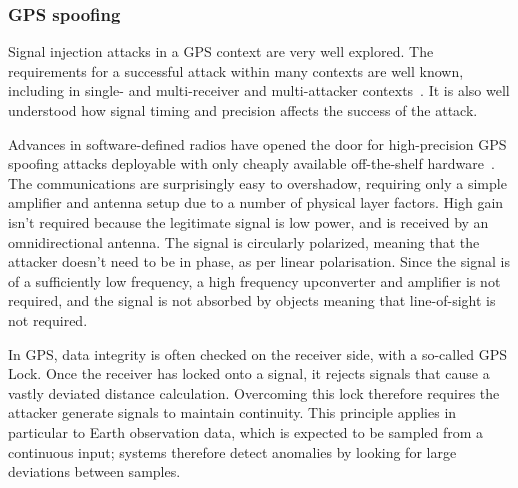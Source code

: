 \subsubsection{GPS spoofing}

Signal injection attacks in a GPS context are very well explored.
The requirements for a successful attack within many contexts are well known, including in single- and multi-receiver and multi-attacker contexts~\cite{tippenhauer2011requirements}.
It is also well understood how signal timing and precision affects the success of the attack.



Advances in software-defined radios have opened the door for high-precision GPS spoofing attacks deployable with only cheaply available off-the-shelf hardware~\cite{gps-sdr-sim}.
The communications are surprisingly easy to overshadow, requiring only a simple amplifier and antenna setup due to a number of physical layer factors.
High gain isn't required because the legitimate signal is low power, and is received by an omnidirectional antenna.
The signal is circularly polarized, meaning that the attacker doesn't need to be in phase, as per linear polarisation.
Since the signal is of a sufficiently low frequency, a high frequency upconverter and amplifier is not required, and the signal is not absorbed by objects meaning that line-of-sight is not required.

In GPS, data integrity is often checked on the receiver side, with a so-called GPS Lock.
Once the receiver has locked onto a signal, it rejects signals that cause a vastly deviated distance calculation.
Overcoming this lock therefore requires the attacker generate signals to maintain continuity.
This principle applies in particular to Earth observation data, which is expected to be sampled from a continuous input; systems therefore detect anomalies by looking for large deviations between samples.



